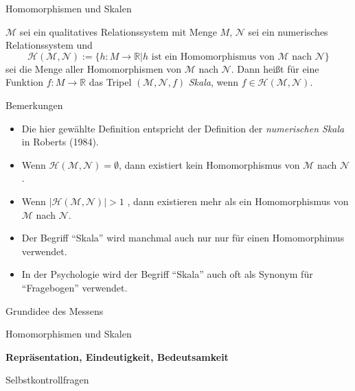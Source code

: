 \documentclass[
  8pt,
  ignorenonframetext,
]{beamer}
\providecommand{\tightlist}{%
  \setlength{\itemsep}{0pt}\setlength{\parskip}{0pt}}
\begin{document}
\begin{frame}{Homomorphismen und Skalen}
\protect\hypertarget{homomorphismen-und-skalen-3}{}
\small
\begin{definition}[Skala]
\justifying
$\mathcal{M}$ sei ein qualitatives Relationssystem mit Menge $M$, $\mathcal{N}$ sei
ein numerisches Relationssystem und
\begin{equation}
\mathcal{H}(\mathcal{M}, \mathcal{N}) := \lbrace h : M \to \mathbb{R} | h \mbox{ ist ein Homomorphismus von } \mathcal{M} \mbox{ nach } \mathcal{N} \rbrace
\end{equation}
sei die Menge aller Homomorphismen von $\mathcal{M}$ nach  $\mathcal{N}$. Dann
heißt für eine Funktion $f : M \to \mathbb{R}$ das Tripel $(\mathcal{M}, \mathcal{N},f)$
\textit{Skala}, wenn $f\in \mathcal{H}(\mathcal{M},\mathcal{N})$.
\end{definition}

Bemerkungen

\begin{itemize}
\tightlist
\item
  Die hier gewählte Definition entspricht der Definition der
  \emph{numerischen Skala} in Roberts (1984).
\item
  Wenn \(\mathcal{H}(\mathcal{M}, \mathcal{N}) = \emptyset\), dann
  existiert kein Homomorphismus von \(\mathcal{M}\) nach
  \(\mathcal{N}\).
\item
  Wenn \(|\mathcal{H}(\mathcal{M}, \mathcal{N})| > 1\) , dann existieren
  mehr als ein Homomorphismus von \(\mathcal{M}\) nach \(\mathcal{N}\).
\item
  Der Begriff ``Skala'' wird manchmal auch nur nur für einen
  Homomorphimus verwendet.
\item
  In der Psychologie wird der Begriff ``Skala'' auch oft als Synonym für
  ``Fragebogen'' verwendet.
\end{itemize}
\end{frame}

\begin{frame}{}
\protect\hypertarget{section-6}{}
\vfill
\Large
{}

Grundidee des Messens

Homomorphismen und Skalen

\textbf{Repräsentation, Eindeutigkeit, Bedeutsamkeit}

Selbstkontrollfragen \vfill
\end{frame}
\end{document}
